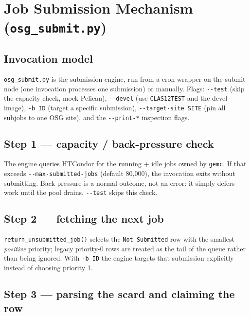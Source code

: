 \section{Job Submission Mechanism (\texttt{osg\_\allowbreak{}submit.\allowbreak{}py})}\label{ch:7}

\subsection{Invocation model}

\texttt{osg\_\allowbreak{}submit.\allowbreak{}py} is the submission engine, run from a cron wrapper on the
submit node (one invocation processes one submission) or manually. Flags:
\texttt{-\allowbreak{}-\allowbreak{}test} (skip the capacity check, mock Pelican),
\texttt{-\allowbreak{}-\allowbreak{}devel} (use \texttt{CLAS12TEST} and the devel image),
\texttt{-\allowbreak{}b ID} (target a specific submission),
\texttt{-\allowbreak{}-\allowbreak{}target-\allowbreak{}site SITE} (pin all subjobs to one OSG site), and the
\texttt{-\allowbreak{}-\allowbreak{}print-\allowbreak{}*} inspection flags.

\subsection{Step 1 --- capacity / back-pressure check}

The engine queries HTCondor for the running + idle jobs owned by \texttt{gemc}. If that exceeds
\texttt{-\allowbreak{}-\allowbreak{}max-\allowbreak{}submitted-\allowbreak{}jobs} (default 80,000), the
invocation exits without submitting. Back-pressure is a normal outcome, not an error: it simply defers work
until the pool drains. \texttt{-\allowbreak{}-\allowbreak{}test} skips this check.

\subsection{Step 2 --- fetching the next job}

\texttt{return\_\allowbreak{}unsubmitted\_\allowbreak{}job()} selects the \texttt{Not Submitted} row with the
smallest \textit{positive} priority; legacy priority-0 rows are treated as the tail of the queue rather than
being ignored. With \texttt{-\allowbreak{}b ID} the engine targets that submission explicitly instead of
choosing priority 1.

\subsection{Step 3 --- parsing the scard and claiming the row}

